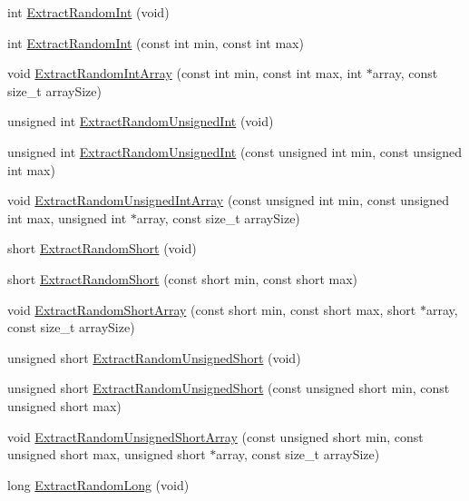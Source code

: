 \begin{DoxyCompactItemize}
\item 
int \hyperlink{classcmn_random_sequence_a43628465b5d9270cc9a01fb647c439f1}{Extract\+Random\+Int} (void)
\item 
int \hyperlink{classcmn_random_sequence_adf8538dc7de0bbc1b16a437ba52f2004}{Extract\+Random\+Int} (const int min, const int max)
\item 
void \hyperlink{classcmn_random_sequence_a820ee61c5483e1b049171dc778f06383}{Extract\+Random\+Int\+Array} (const int min, const int max, int $\ast$array, const size\+\_\+t array\+Size)
\item 
unsigned int \hyperlink{classcmn_random_sequence_a7a840800c30ab14108dac2263c420be6}{Extract\+Random\+Unsigned\+Int} (void)
\item 
unsigned int \hyperlink{classcmn_random_sequence_ad2b6355300b3f705c7bf3848be6e18b6}{Extract\+Random\+Unsigned\+Int} (const unsigned int min, const unsigned int max)
\item 
void \hyperlink{classcmn_random_sequence_a8d59e4516f96a0353d06f1969a670d46}{Extract\+Random\+Unsigned\+Int\+Array} (const unsigned int min, const unsigned int max, unsigned int $\ast$array, const size\+\_\+t array\+Size)
\item 
short \hyperlink{classcmn_random_sequence_abdf69962248104b2eee18749c8503e7c}{Extract\+Random\+Short} (void)
\item 
short \hyperlink{classcmn_random_sequence_aff095dc034e2006d00a109c0d1db3853}{Extract\+Random\+Short} (const short min, const short max)
\item 
void \hyperlink{classcmn_random_sequence_ae0858e1f691e1a2e7f796ed5c7449cf3}{Extract\+Random\+Short\+Array} (const short min, const short max, short $\ast$array, const size\+\_\+t array\+Size)
\item 
unsigned short \hyperlink{classcmn_random_sequence_a66257ddc3c2bfb0671535c0ed2384ce8}{Extract\+Random\+Unsigned\+Short} (void)
\item 
unsigned short \hyperlink{classcmn_random_sequence_a49d37a9086b64319943474021f072890}{Extract\+Random\+Unsigned\+Short} (const unsigned short min, const unsigned short max)
\item 
void \hyperlink{classcmn_random_sequence_a1f916447aa7357dbbee73718eadc9665}{Extract\+Random\+Unsigned\+Short\+Array} (const unsigned short min, const unsigned short max, unsigned short $\ast$array, const size\+\_\+t array\+Size)
\item 
long \hyperlink{classcmn_random_sequence_a5dc43256508109a413cdf9090c9c9cfa}{Extract\+Random\+Long} (void)

\end{DoxyCompactItemize}

